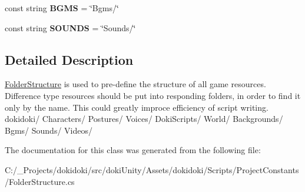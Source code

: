 \begin{DoxyCompactItemize}
\item 
const string {\bfseries B\+G\+MS} = \char`\"{}Bgms/\char`\"{}\hypertarget{classdoki_unity_1_1_folder_structure_abfb4a2b0d28b713dc9035b1b5f0e6dec}{}\label{classdoki_unity_1_1_folder_structure_abfb4a2b0d28b713dc9035b1b5f0e6dec}

\item 
const string {\bfseries S\+O\+U\+N\+DS} = \char`\"{}Sounds/\char`\"{}\hypertarget{classdoki_unity_1_1_folder_structure_a541767aff5856d20ac94b5207397d517}{}\label{classdoki_unity_1_1_folder_structure_a541767aff5856d20ac94b5207397d517}

\end{DoxyCompactItemize}


\subsection{Detailed Description}
\hyperlink{classdoki_unity_1_1_folder_structure}{Folder\+Structure} is used to pre-\/define the structure of all game resources. Difference type resources should be put into responding folders, in order to find it only by the name. This could greatly improce efficiency of script writing. dokidoki/ Characters/ Postures/ Voices/ Doki\+Scripts/ World/ Backgrounds/ Bgms/ Sounds/ Videos/ 



The documentation for this class was generated from the following file\+:\begin{DoxyCompactItemize}
\item 
C\+:/\+\_\+\+Projects/dokidoki/src/doki\+Unity/\+Assets/dokidoki/\+Scripts/\+Project\+Constants/Folder\+Structure.\+cs\end{DoxyCompactItemize}
